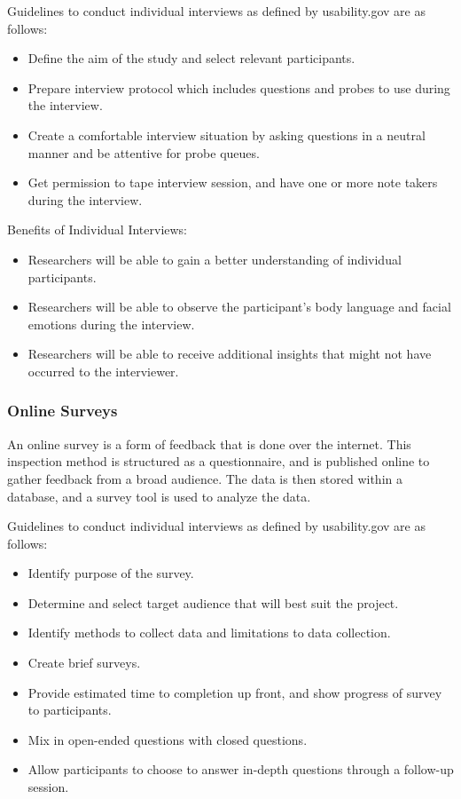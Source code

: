 \documentclass[10pt,journal,compsoc,draftclsnofoot]{IEEEtran}
\begin{document}
Guidelines to conduct individual interviews as defined by usability.gov are as follows:
\begin{itemize}
\item Define the aim of the study and select relevant participants.
\item Prepare interview protocol which includes questions and probes to use during the interview.
\item Create a comfortable interview situation by asking questions in a neutral manner and be attentive for probe queues.
\item Get permission to tape interview session, and have one or more note takers during the interview.
\end{itemize}

Benefits of Individual Interviews:
\begin{itemize}
\item Researchers will be able to gain a better understanding of individual participants.
\item Researchers will be able to observe the participant's body language and facial emotions during the interview.
\item Researchers will be able to receive additional insights that might not have occurred to the interviewer.
\end{itemize}

\subsubsection{Online Surveys \cite{userResearch}} 
An online survey is a form of feedback that is done over the internet.
This inspection method is structured as a questionnaire, and is published online to gather feedback from a broad audience.
The data is then stored within a database, and a survey tool is used to analyze the data.

Guidelines to conduct individual interviews as defined by usability.gov are as follows:
\begin{itemize}
\item Identify purpose of the survey.
\item Determine and select target audience that will best suit the project.
\item Identify methods to collect data and limitations to data collection.
\item Create brief surveys.
\item Provide estimated time to completion up front, and show progress of survey to participants.
\item Mix in open-ended questions with closed questions.
\item Allow participants to choose to answer in-depth questions through a follow-up session.
\end{itemize}
\end{document}
